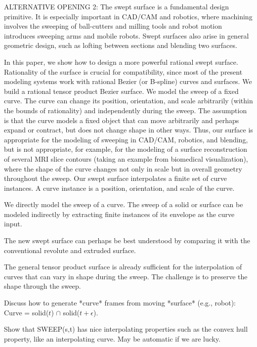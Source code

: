 ALTERNATIVE OPENING 2:
The swept surface is a fundamental design primitive.
It is especially important in CAD/CAM and robotics, where
machining involves the sweeping of ball-cutters and milling tools and 
robot motion introduces sweeping arms and mobile robots.
Swept surfaces also arise in general geometric design, 
such as lofting between sections and blending two surfaces.

In this paper, we show how to design a more powerful rational swept surface. 
Rationality of the surface is crucial for compatibility, 
since most of the present modeling systems work with rational Bezier (or
B-spline) curves and surfaces.
We build a rational tensor product Bezier surface.
We model the sweep of a fixed curve.
The curve can change its position, orientation, and scale arbitrarily
(within the bounds of rationality) and independently during the sweep.
The assumption is that the curve models a fixed object that can
move arbitrarily and perhaps expand or contract, but does not change
shape in other ways.
Thus, our surface is appropriate for the modeling of sweeping in
CAD/CAM, robotics, and blending, but is not appropriate, for example,
for the modeling of a surface reconstruction of several MRI slice
contours (taking an example from biomedical visualization), 
where the shape of the curve changes not only in scale but in overall
geometry throughout the sweep.
Our swept surface interpolates a finite set of curve instances.
A curve instance is a position, orientation, and scale of the curve.

We directly model the sweep of a curve.
The sweep of a solid or surface can be modeled indirectly
by extracting finite instances of its envelope as the curve input.

The new swept surface can perhaps be best understood by comparing it
with the conventional revolute and extruded surface.


The general tensor product surface is already sufficient for the interpolation
of curves that can vary in shape during the sweep.
The challenge is to preserve the shape through the sweep.

Discuss how to generate *curve* frames from moving  *surface* (e.g., 
      robot): Curve = solid($t$) $\cap$ solid($t+\epsilon$).

Show that SWEEP(s,t) has nice interpolating properties such
as the convex hull property, like an interpolating curve.
May be automatic if we are lucky.

